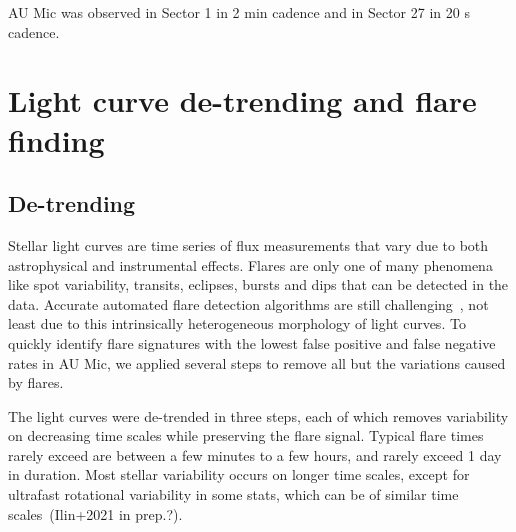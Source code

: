 \documentclass[fleqn,usenatbib,letters]{mnras}%
\begin{document}
AU Mic was observed in Sector 1 in 2 min cadence and in Sector 27 in 20 s cadence. 


\section{Light curve de-trending and flare finding}
\label{sec:detrendfind}

\subsection{De-trending}
Stellar light curves are time series of flux measurements that vary due to both astrophysical and instrumental effects. Flares are only one of many phenomena like spot variability, transits, eclipses, bursts and dips that can be detected in the data. Accurate automated flare detection algorithms are still challenging~\citep{vida2021}, not least due to this intrinsically heterogeneous morphology of light curves. To quickly identify flare signatures with the lowest false positive and false negative rates in AU Mic, we applied several steps to remove all but the variations caused by flares.



The light curves were de-trended in three steps, each of which removes variability on decreasing time scales while preserving the flare signal. Typical flare times rarely exceed are between a few minutes to a few hours, and rarely exceed 1 day in duration. Most stellar variability occurs on longer time scales, except for ultrafast rotational variability in some stats, which can be of similar time scales~(Ilin+2021 in prep.?).   
\end{document}
